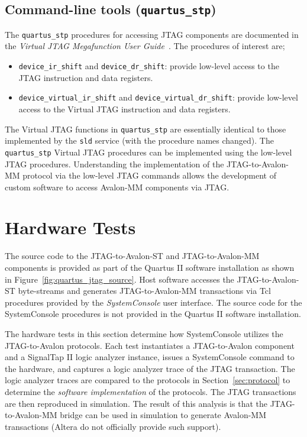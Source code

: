 \documentclass[10pt,twoside]{article}
\begin{document}
\subsection{Command-line tools ({\tt quartus\_stp})}
\label{sec:quartus_stp}

The \verb+quartus_stp+ procedures for accessing JTAG components
are documented in the {\em Virtual JTAG Megafunction User 
Guide}~\cite{Altera_Virtual_JTAG_2008}.
The procedures of interest are;
%
\begin{itemize}
\item \verb+device_ir_shift+ and \verb+device_dr_shift+: provide
low-level access to the JTAG instruction and data registers.
%
\item \verb+device_virtual_ir_shift+ and \verb+device_virtual_dr_shift+: provide
low-level access to the Virtual JTAG instruction and data registers.
\end{itemize}
%
The Virtual JTAG functions in \verb+quartus_stp+ are essentially
identical to those implemented by the \verb+sld+ service
(with the procedure names changed). The \verb+quartus_stp+ Virtual
JTAG procedures can be implemented using the low-level
JTAG procedures. Understanding the implementation of the
JTAG-to-Avalon-MM protocol via the low-level JTAG commands
allows the development of custom software to access Avalon-MM
components via JTAG.

\clearpage
\section{Hardware Tests}
\label{sec:hardware}

The source code to the JTAG-to-Avalon-ST and JTAG-to-Avalon-MM
components is provided as part of the Quartus II software
installation as shown in Figure~\ref{fig:quartus_jtag_source}.
%
Host software accesses the JTAG-to-Avalon-ST byte-streams and
generates JTAG-to-Avalon-MM transactions via Tcl procedures
provided by the {\em SystemConsole} user interface. The source
code for the SystemConsole procedures is not provided
in the Quartus II software installation.

The hardware tests in this section determine how SystemConsole
utilizes the JTAG-to-Avalon protocols. 
Each test instantiates a JTAG-to-Avalon component and a SignalTap
II logic analyzer instance, issues a SystemConsole command to
the hardware, and captures a logic analyzer trace of the JTAG
transaction.
The logic analyzer traces are compared to the protocols in
Section~\ref{sec:protocol} to determine the {\em software 
implementation} of the protocols.
The JTAG transactions are then reproduced in simulation.
The result of this analysis is that the JTAG-to-Avalon-MM bridge
can be used in simulation to generate Avalon-MM transactions
(Altera do not officially provide such support).
\end{document}
